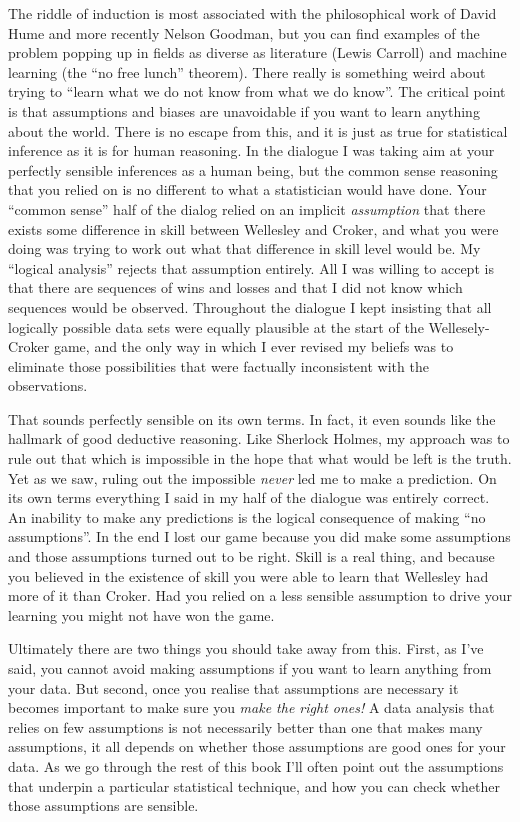 The riddle of induction is most associated with the philosophical work of David Hume and more recently Nelson Goodman, but you can find examples of the problem popping up in fields as diverse as literature (Lewis Carroll) and machine learning (the ``no free lunch'' theorem). There really is something weird about trying to ``learn what we do not know from what we do know''. The critical point is that assumptions and biases are unavoidable if you want to learn anything about the world. There is no escape from this, and it is just as true for statistical inference as it is for human reasoning. In the dialogue I was taking aim at your perfectly sensible inferences as a human being, but the common sense reasoning that you relied on is no different to what a statistician would have done. Your ``common sense'' half of the dialog relied on an implicit {\it assumption} that there exists some difference in skill between Wellesley and Croker, and what you were doing was trying to work out what that difference in skill level would be. My ``logical analysis'' rejects that assumption entirely. All I was willing to accept is that there are sequences of wins and losses and that I did not know which sequences would be observed. Throughout the dialogue I kept insisting that all logically possible data sets were equally plausible at the start of the Wellesely-Croker game, and the only way in which I ever revised my beliefs was to eliminate those possibilities that were factually inconsistent with the observations. 

That sounds perfectly sensible on its own terms. In fact, it even sounds like the hallmark of good deductive reasoning. Like Sherlock Holmes, my approach was to rule out that which is impossible in the hope that what would be left is the truth. Yet as we saw, ruling out the impossible {\it never} led me to make a prediction. On its own terms everything I said in my half of the dialogue was entirely correct. An inability to make any predictions is the logical consequence of making ``no assumptions''. In the end I lost our game because you did make some assumptions and those assumptions turned out to be right. Skill is a real thing, and because you believed in the existence of skill you were able to learn that Wellesley had more of it than Croker. Had you relied on a less sensible assumption to drive your learning you might not have won the game. 

Ultimately there are two things you should take away from this. First, as I've said, you cannot avoid making assumptions if you want to learn anything from your data. But second, once you realise that assumptions are necessary it becomes important to make sure you {\it make the right ones!} A data analysis that relies on few assumptions is not necessarily better than one that makes many assumptions, it all depends on whether those assumptions are good ones for your data. As we go through the rest of this book I'll often point out the assumptions that underpin a particular statistical technique, and how you can check whether those assumptions are sensible.
